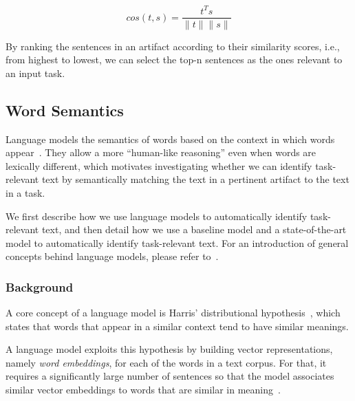 \begin{equation}
    cos(t,s) = \frac{t^Ts}{\|t\| \|s\|}
    \label{eq:lex-sim}
\end{equation}
\smallskip

By ranking the sentences in an artifact according to their similarity scores, i.e., from highest to lowest,
we can  select the top-n sentences as the ones relevant to an input task.




\subsection{Word Semantics}


Language models  the semantics of words based on the context in which words appear~\cite{harris1954distributional}.
They allow a more ``human-like reasoning'' even when words are lexically different, which 
motivates investigating whether we can identify task-relevant text by semantically matching the text in a pertinent artifact to the text in a task.



We first describe how we use language models to automatically identify task-relevant text, and then
detail how we use a baseline model   and 
a state-of-the-art model to automatically identify task-relevant text.
For an introduction of general concepts behind language models, please refer to~\cite{zhang2021deep-learning}.

\subsubsection{Background}

A core concept of a language model is Harris' distributional hypothesis~\cite{harris1954distributional}, which states that words that appear in a similar context tend to have similar meanings.


A language model exploits this hypothesis by building vector representations, namely \textit{word embeddings}, for each of the words in a text corpus.
For that, it requires a significantly large number of sentences so that
the model associates similar vector embeddings to words that are similar in meaning~\cite{Ye2016}. 


